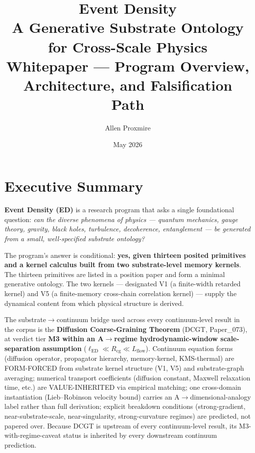 \documentclass[11pt,a4paper]{article}
\title{\vspace{-1cm}\Large\bfseries Event Density\\[6pt]
\large\mdseries A Generative Substrate Ontology for Cross-Scale Physics\\[4pt]
\normalsize\mdseries Whitepaper --- Program Overview, Architecture, and Falsification Path}
\author{Allen Proxmire}
\date{May 2026}
\begin{document}
\maketitle

\section*{Executive Summary}

\textbf{Event Density (ED)} is a research program that asks a single foundational question: \emph{can the diverse phenomena of physics --- quantum mechanics, gauge theory, gravity, black holes, turbulence, decoherence, entanglement --- be generated from a small, well-specified substrate ontology?}

The program's answer is conditional: \textbf{yes, given thirteen posited primitives and a kernel calculus built from two substrate-level memory kernels}. The thirteen primitives are listed in a position paper and form a minimal generative ontology. The two kernels --- designated V1 (a finite-width retarded kernel) and V5 (a finite-memory cross-chain correlation kernel) --- supply the dynamical content from which physical structure is derived.

The substrate$\to$continuum bridge used across every continuum-level result in the corpus is the \textbf{Diffusion Coarse-Graining Theorem} (DCGT, Paper\_073), at verdict tier \textbf{M3 within an A$\to$regime hydrodynamic-window scale-separation assumption} ($\ell_\mathrm{ED} \ll R_\mathrm{cg} \ll L_\mathrm{flow}$). Continuum equation forms (diffusion operator, propagator hierarchy, memory-kernel, KMS-thermal) are FORM-FORCED from substrate kernel structure (V1, V5) and substrate-graph averaging; numerical transport coefficients (diffusion constant, Maxwell relaxation time, etc.) are VALUE-INHERITED via empirical matching; one cross-domain instantiation (Lieb--Robinson velocity bound) carries an A$\to$dimensional-analogy label rather than full derivation; explicit breakdown conditions (strong-gradient, near-substrate-scale, near-singularity, strong-curvature regimes) are predicted, not papered over. Because DCGT is upstream of every continuum-level result, its M3-with-regime-caveat status is inherited by every downstream continuum prediction.
\end{document}
